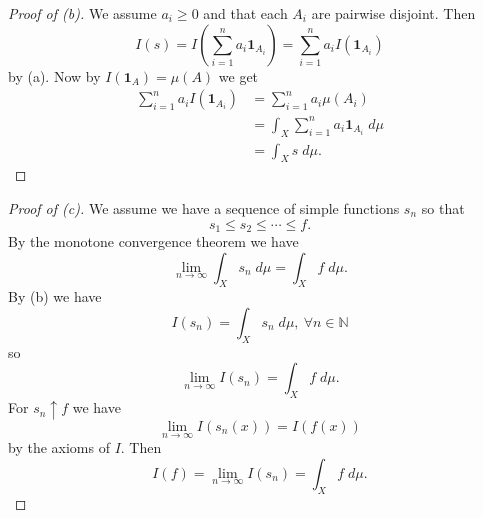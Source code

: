 \begin{proof}[Proof of (b)]
    We assume $a_i \geq 0$ and that each $A_i$ are 
    pairwise disjoint. Then 
    \[
        I(s) = 
        I\left(\sum_{i=1}^n a_i \textbf{1}_{A_i}\right)
        = 
        \sum_{i=1}^n a_i I(\textbf{1}_{A_i})
    \]
    by (a). Now by $I(\textbf{1}_A) = \mu(A)$ we get 
    \begin{align*}
        \sum_{i=1}^n a_i I(\textbf{1}_{A_i})
        &= 
        \sum_{i=1}^n a_i \mu(A_i) \\ 
        &= \int_X \sum_{i=1}^n a_i \textbf{1}_{A_i} \; d\mu \\ 
        &= \int_X s \; d\mu.
    \end{align*}
\end{proof}
\begin{proof}[Proof of (c)]
    We assume we have a sequence of simple functions $s_n$ so 
    that 
    \[
        s_1 \leq s_2 \leq \cdots \leq f.
    \]
    By the monotone convergence theorem we have 
    \[
        \lim_{n\to\infty} \int_X s_n \; d\mu 
        = 
        \int_X f \; d\mu.  
    \]
    By (b) we have 
    \[
        I(s_n) = \int_X s_n \; d\mu, \ \forall n \in \mathbb N
    \]
    so 
    \[
        \lim_{n\to\infty} I(s_n) = \int_X f\; d\mu. 
    \]
    For $s_n \uparrow f$ we have 
    \[
        \lim_{n\to\infty} I(s_n(x)) = I(f(x))
    \]
    by the axioms of $I$.
    Then 
    \[
        I(f) = \lim_{n\to\infty} I(s_n) 
        = \int_X f \; d\mu.
    \]
\end{proof}

